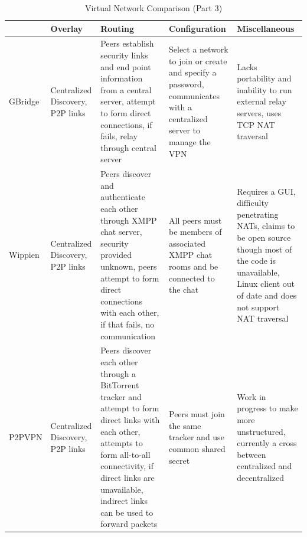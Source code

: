 \begin{table}[ht]
{\small
\centering
\begin{tabular}{|p{.8in}||p{1.25in}|p{1.25in}|p{1.25in}|p{1.25in}|} \hline
& Overlay & Routing & Configuration & Miscellaneous \\ \hline\hline
GBridge
&
Centralized Discovery, P2P links
&
Peers establish security links and end point information from a central
server, attempt to form direct connections, if fails, relay through central
server
&
Select a network to join or create and specify a password, communicates with a
centralized server to manage the VPN
&
Lacks portability and inability to run external relay servers, uses TCP NAT
traversal
\\ \hline
Wippien
&
Centralized Discovery, P2P links
&
Peers discover and authenticate each other through XMPP chat server, security
provided unknown, peers attempt to form direct connections with each other, if
that fails, no communication
&
All peers must be members of associated XMPP chat rooms and be connected to the
chat
&
Requires a GUI, difficulty penetrating NATs, claims to be open source though
most of the code is unavailable, Linux client out of date and does not support
NAT traversal
\\ \hline
P2PVPN
&
Centralized Discovery, P2P links
&
Peers discover each other through a BitTorrent tracker and attempt to form
direct links with each other, attempts to form all-to-all connectivity, if
direct links are unavailable, indirect links can be used to forward packets
&
Peers must join the same tracker and use common shared secret
&
Work in progress to make more unstructured, currently a cross between
centralized and decentralized
\\ \hline
\end{tabular}
}
\caption{Virtual Network Comparison (Part 3)}
\label{tab:virtual_networks_part3}
\end{table}

